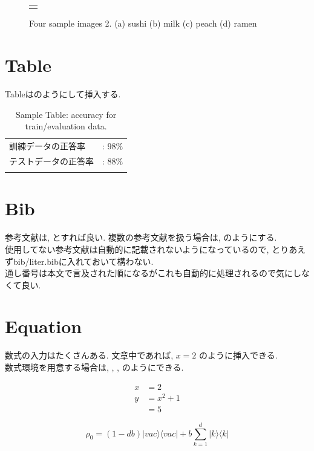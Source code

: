 \begin{figure}[H]
\begin{tabular}{c}
\begin{minipage}{0.25\hsize}
				\text{(d)}
			\end{minipage}
		\end{tabular}
		\caption[Four sample images]
		{
			Four sample images 2.
			(a) sushi (b) milk (c) peach (d) ramen
		}
		\label{fig:sample_four_images2}
	\end{figure}
    
\section{Table}
Tableはのようにして挿入する.
\begin{table}[H]
	\centering
	\caption{Sample Table: accuracy for train/evaluation data.}
	\begin{tabular}{ll}\hline
		 訓練データの正答率&: $98\%$ \\
		 テストデータの正答率&: $88\%$ \\
	\label{tb:sample_table}
	\end{tabular}
\end{table}

\section{Bib}
参考文献は, \cite{author:06}とすれば良い.
複数の参考文献を扱う場合は, \cite{author:06, conference:06}のようにする.\\
使用してない参考文献は自動的に記載されないようになっているので, とりあえずbib/liter.bibに入れておいて構わない.\\
通し番号は本文で言及された順になるがこれも自動的に処理されるので気にしなくて良い.

\section{Equation}
数式の入力はたくさんある.
文章中であれば, $x = 2$ のように挿入できる.\\
数式環境を用意する場合は, , , のようにできる.

\begin{align}
    x &= 2 \label{eq:sample1}\\
    y &= x^2 + 1 \label{eq:sample2}\\
      &= 5 \label{eq:sample3}
\end{align}


\begin{equation}\rho_0=(1−db)|vac\rangle\langle vac|+b
\sum_{k=1}^{d}|k\rangle\langle k| \label{sample_rho_0}
\end{equation}

